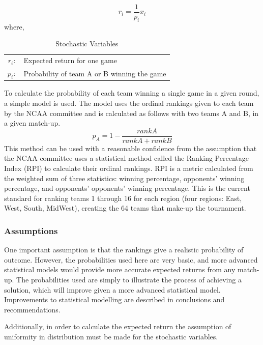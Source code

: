 \documentclass[12pt]{article}
\begin{document}
\begin{equation*}
r_i=\frac{1}{p_i}x_i
\end{equation*}
where,

\begin{table}[htbp!]
\begin{centering}
    \begin{tabular}{r l}
    $r_i:$      & Expected return for one game \\ 
    $p_i:$      & Probability of team A or B winning the game \\ 
    \end{tabular}
    \label{op_vars}
    \caption{Stochastic Variables}
\end{centering}
\end{table}

To calculate the probability of each team winning a single game in a given round, a simple model is used.
The model uses the ordinal rankings given to each team by the NCAA committee and is calculated as follows with two teams A and B, in a given match-up.
\begin{equation}
p_A = 1 - \frac{rank A}{rank A + rank B}
\end{equation}
This method can be used with a reasonable confidence from the assumption that the NCAA committee uses a statistical method called the Ranking Percentage Index (RPI) to calculate their ordinal rankings.
RPI is a metric calculated from the weighted sum of three statistics: winning percentage, opponents' winning percentage, and opponents' opponents' winning percentage. 
This is the current standard for ranking teams 1 through 16 for each region (four regions: East, West, South, MidWest), creating the 64 teams that make-up the tournament.

\subsubsection{Assumptions}
One important assumption is that the rankings give a realistic probability of outcome.
However, the probabilities used here are very basic, and more advanced statistical models would provide more accurate expected returns from any match-up.
The probabilities used are simply to illustrate the process of achieving a solution, which will improve given a more advanced statistical model.
Improvements to statistical modelling are described in conclusions and recommendations.

Additionally, in order to calculate the expected return the assumption of uniformity in distribution must be made for the stochastic variables.
\end{document}
